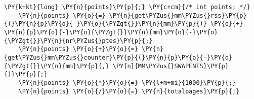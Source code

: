\begin{Verbatim}[commandchars=\\\{\},codes={\catcode`\$=3\catcode`\^=7\catcode`\_=8}]
    \PY{k+kt}{long} \PY{n}{points}\PY{p}{;} \PY{c+cm}{/* int points; */}
    \PY{n}{points} \PY{o}{=} \PY{n}{get\PYZus{}mm\PYZus{}rss}\PY{p}{(}\PY{n}{p}\PY{o}{-}\PY{o}{\PYZgt{}}\PY{n}{mm}\PY{p}{)} \PY{o}{+} \PY{n}{p}\PY{o}{-}\PY{o}{\PYZgt{}}\PY{n}{mm}\PY{o}{-}\PY{o}{\PYZgt{}}\PY{n}{nr\PYZus{}ptes}\PY{p}{;}
    \PY{n}{points} \PY{o}{+}\PY{o}{=} \PY{n}{get\PYZus{}mm\PYZus{}counter}\PY{p}{(}\PY{n}{p}\PY{o}{-}\PY{o}{\PYZgt{}}\PY{n}{mm}\PY{p}{,} \PY{n}{MM\PYZus{}SWAPENTS}\PY{p}{)}\PY{p}{;}
    \PY{n}{points} \PY{o}{*}\PY{o}{=} \PY{l+m+mi}{1000}\PY{p}{;}
    \PY{n}{points} \PY{o}{/}\PY{o}{=} \PY{n}{totalpages}\PY{p}{;}
\end{Verbatim}
